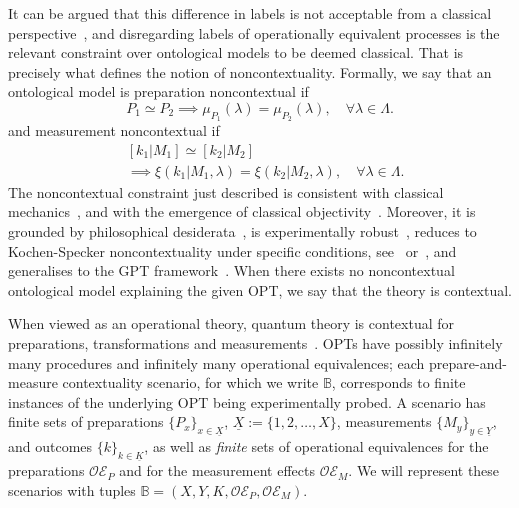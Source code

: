 \documentclass[letterpaper,onecolumn,12pt,accepted=2024-01-17]{article}
\begin{document}
It can be argued that this difference in labels is not acceptable from a classical perspective~\cite{spekkens2005contextuality,spekkens2019ontological}, and disregarding labels of operationally equivalent processes is the relevant constraint over ontological models to be deemed classical. That is precisely what defines the notion of noncontextuality. Formally, we say that an ontological model is preparation noncontextual if
\begin{equation}\label{eq: prep noncontextuality}
    P_1 \simeq P_2 \implies \mu_{P_1}(\lambda) = \mu_{P_2}(\lambda),\quad \forall \lambda \in \Lambda.
\end{equation}
and measurement noncontextual if {
\begin{align}\label{eq: measurement noncontextuality}
    &[k_1\vert M_1] \simeq [k_2 \vert M_2]\nonumber\\
    &\implies \xi(k_1\vert M_1,\lambda)=\xi(k_2\vert M_2,\lambda),\quad \forall \lambda \in \Lambda.
\end{align}
}
The noncontextual constraint just described is consistent with classical mechanics~\cite[Supp. Material A]{lostaglio_certifying_2020}, and with the emergence of classical objectivity~\cite{baldijao_emergence_2021}. Moreover, it is grounded by philosophical desiderata~\cite{spekkens2019ontological}, is experimentally robust~\cite{mazurek2016experimental,mazurek2021experimentally}, reduces to Kochen-Specker noncontextuality under specific conditions, see~\cite[Section 1.3.2]{kunjwal2016contextuality} or~\cite{leifer2013maximally}, and generalises to the GPT framework~\cite{schmid2021characterization,shahandeh2021contextuality}. When there exists no noncontextual ontological model explaining the given OPT, we say that the theory is contextual. 

When viewed as an operational theory, quantum theory is contextual for preparations, transformations and measurements~\cite{spekkens2005contextuality,banik2014ontological,lillystone2019contextuality,kunjwal2019beyondcabello}. OPTs have possibly infinitely many procedures and infinitely many operational equivalences; each prepare-and-measure contextuality scenario, for which we write $\mathbb{B}$, corresponds to finite instances of the underlying OPT being experimentally probed. A  scenario has finite sets of preparations $\{P_x\}_{x \in \underline{X}}$, $\underline{X} := \{1,2,\dots,X\}$, measurements $\{M_y\}_{y \in \underline{Y}}$, and outcomes $\{k\}_{k \in \underline{K}}$, as well as \textit{finite} sets of operational equivalences for the preparations $\mathcal{OE}_P$ and for the measurement effects $\mathcal{OE}_M$. We will represent these scenarios with tuples $\mathbb{B} = (X,Y,K,\mathcal{OE}_P,\mathcal{OE}_M)$.  
\end{document}
